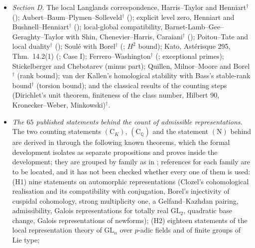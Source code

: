 \documentclass[10pt]{amsart}
\theoremstyle{definition}
\theoremstyle{remark}
\newcommand{\Q}{\mathbb Q}
\begin{document}
\begin{itemize}
inputs (F1)--(F3) of \cite[Lemma~\ref{A-i3:S-lem-FD}]{Annex} (Godement,
Borel, finite multiplicity in the discrete spectrum)$^\dagger$;
Gelfand--Graev multiplicity one$^\dagger$
(\cite[Lemma~\ref{A-i3:S-lem-GGmult}]{Annex}); Weyl's dimension formula;
and the hypotheses (SW) and (G), which are assumed.
\item \emph{Section D.} The local Langlands correspondence, Harris--Taylor
and Henniart$^\dagger$ (\cite[Theorem~\ref{A-i5:thm-llc}]{Annex});
Aubert--Baum--Plymen--Solleveld$^\dagger$
(\cite[Theorem~\ref{A-i5:thm-abps}]{Annex}); explicit level zero, Henniart and
Bushnell--Henniart$^\dagger$ (\cite[Theorem~\ref{A-i5:thm-lz}]{Annex});
local-global compatibility, Barnet-Lamb--Gee--Geraghty--Taylor with Shin,
Chenevier--Harris, Caraiani$^\dagger$
(\cite[Theorem~\ref{A-i5:thm-blggt}]{Annex}); Poitou--Tate and local
duality$^\dagger$ (\cite[Theorem~\ref{A-i5:thm-pt}]{Annex}); Soul\'e with
Borel$^\dagger$ (\cite[Theorem~\ref{A-i5:thm-soule}]{Annex}; $H^2$ bound);
Kato, Ast\'erisque 295, Thm.~14.2(1) (\cite[Theorem~\ref{A-i5:x-thm:kato}]{Annex};
Case I); Ferrero--Washington$^\dagger$
(\cite[Theorem~\ref{A-i5:thm-fw}]{Annex}; exceptional primes);
Stickelberger and Chebotarev (minus part); Quillen, Milnor--Moore and
Borel$^\dagger$ (rank bound); van der Kallen's homological stability with
Bass's stable-rank bound$^\dagger$ (torsion bound); and the classical
results of the counting steps (Dirichlet's unit theorem, finiteness of the
class number, Hilbert 90, Kronecker--Weber, Minkowski)$^\dagger$.
\item \emph{The $65$ published statements behind the count of admissible
representations.} The two counting statements $(\mathrm C_K)$,
$(\mathrm C_\Q)$ and the statement $(\mathrm N)$ behind
\cite[Proposition~\ref{A-i5:x-prop:u3count}]{Annex} are derived in
\cite{CharacterFamily} through the following known theorems, which the
formal development isolates as separate propositions and proves inside the
development; they are grouped by family as in \cite{Annex}; references for
each family are to be located, and it has not been checked whether every
one of them is used:
(H1) nine statements on automorphic representations (Clozel's
cohomological realisation and its compatibility with conjugation, Borel's
injectivity of cuspidal cohomology, strong multiplicity one, a
Gelfand--Kazhdan pairing, admissibility, Galois representations for totally
real $\mathrm{GL}_2$, quadratic base change, Galois representations of
newforms); (H2) eighteen statements of the local representation theory of
$\mathrm{GL}_n$ over $p$-adic fields and of finite groups of Lie type;

\end{itemize}
\end{document}
